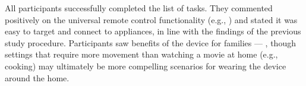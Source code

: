 
All participants successfully completed the list of tasks. They commented positively on the universal remote control functionality (e.g., ) and stated it was easy to target and connect to appliances, in line with the findings of the previous study procedure. Participants saw benefits of the device for families --- , though settings that require more movement than watching a movie at home (e.g., cooking) may ultimately be more compelling scenarios for wearing the device around the home.


